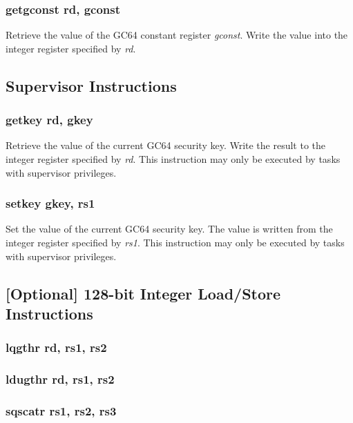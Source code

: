 \documentclass{article}
\begin{document}
\subsubsection{getgconst rd, gconst}

Retrieve the value of the GC64 constant register \emph{gconst}.  Write
the value into the integer register specified by \emph{rd}.

\subsection{Supervisor Instructions}
\subsubsection{getkey rd, gkey}

Retrieve the value of the current GC64 security key.  Write
the result to the integer register specified by \emph{rd}.  This
instruction may only be executed by tasks with supervisor privileges. 

\subsubsection{setkey gkey, rs1}

Set the value of the current GC64 security key.  The value is written
from the integer register specified by \emph{rs1}.  This instruction
may only be executed by tasks with supervisor privileges.  

\subsection{[Optional] 128-bit Integer Load/Store Instructions}

\subsubsection{lqgthr rd, rs1, rs2}
\subsubsection{ldugthr rd, rs1, rs2}

\subsubsection{sqscatr rs1, rs2, rs3}
\end{document}
